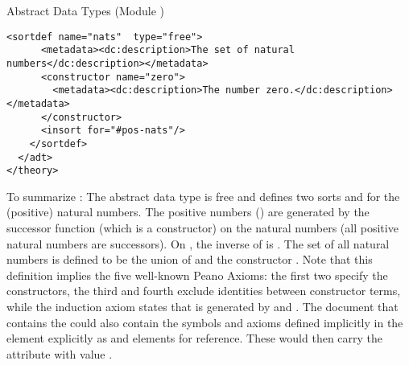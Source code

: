 \begin{tchapter}[id=adt,short=Abstract Data Types]{Abstract Data Types (Module {})}
\begin{lstlisting}[label=lst:nat-adt,
  caption={The natural numbers using {\element{adt}} in {\omdoc}},
  index={adt,sortdef,constructor,argument,selector,recognizer,insort}]
    <sortdef name="nats"  type="free">
      <metadata><dc:description>The set of natural numbers</dc:description></metadata>
      <constructor name="zero">
        <metadata><dc:description>The number zero.</dc:description></metadata>
      </constructor>
      <insort for="#pos-nats"/>
    </sortdef>
  </adt>
</theory>
\end{lstlisting}
To summarize {}: The abstract data type {} is free and
defines two sorts {} and {} for the (positive) natural
numbers. The positive numbers ({}) are generated by the successor
function (which is a constructor) on the natural numbers (all positive natural numbers are
successors). On {}, the inverse {} of {} is
{}.  The set {} of all natural numbers is defined to be the
union of {} and the constructor {}.  Note that this
definition implies the five well-known Peano Axioms: the first two specify the
constructors, the third and fourth exclude identities between constructor terms, while the
induction axiom states that {} is generated by {} and
{}.  The document that contains the {} could also contain
the symbols and axioms defined implicitly in the {} element explicitly as
{} and {} elements for reference.  These would then carry
the {} attribute with value
{}.
\end{tchapter}


